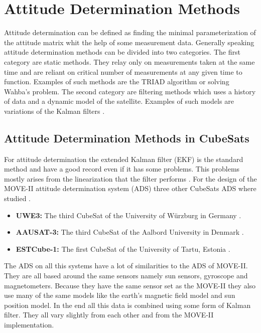 \chapter{Attitude Determination Methods}\label{chap:EKF}

Attitude determination can be defined as finding the minimal parameterization of the attitude matrix whit the help of some measurement data. Generally speaking attitude determination methods can be divided into two categories. The first category are static methods. They relay only on measurements taken at the same time and are reliant on critical number of measurements at any given time to function. Examples of such methods are the TRIAD algorithm or solving Wahba's problem. The second category are filtering methods which uses a history of data and a dynamic model of the satellite. Examples of such models are variations of the Kalman filters \cite{SADCS}.        

\section{Attitude Determination Methods in CubeSats}
For attitude determination the extended Kalman filter (EKF) is the standard method and have a good record even if it has some problems. This problems mostly arises from the linearization that the filter performs \cite{attdetSur}. For the design of the MOVE-II attitude determination system (ADS) three other CubeSats ADS where studied \cite{DavidThesis}. 

\begin{itemize}
  \item \textbf{UWE3:} The third CubeSat of the University of Würzburg in Germany \cite{UWE-3}.
  \item \textbf{AAUSAT-3:} The third CubeSat of the Aalbord University in Denmark \cite{aausat}. 
  \item \textbf{ESTCube-1:} The first CubeSat of the University of Tartu, Estonia \cite{EST}.
\end{itemize}       

The ADS on all this systems have a lot of similarities to the ADS of MOVE-II. They are all based around the same sensors namely sun sensors, gyroscope and magnetometers. Because they have the same sensor set as the MOVE-II they also use many of the same models like the earth's magnetic field model and sun position model. In the end all this data is combined using some form of Kalman filter. They all vary slightly from each other and from the MOVE-II implementation. 

